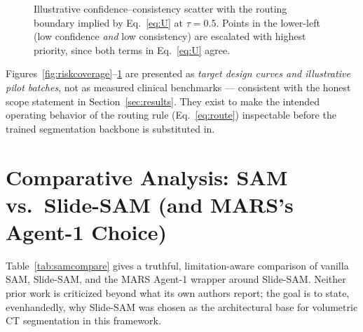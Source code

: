 \documentclass[11pt,a4paper]{article}
\begin{document}
\begin{figure}[htbp]
\centering
{}
\caption{Illustrative confidence--consistency scatter with the routing boundary implied by Eq.~\ref{eq:U} at $\tau=0.5$. Points in the lower-left (low confidence \emph{and} low consistency) are escalated with highest priority, since both terms in Eq.~\ref{eq:U} agree.}
\label{fig:scatter}
\end{figure}

\begin{keytakeaway}
Figures~\ref{fig:riskcoverage}--\ref{fig:scatter} are presented as \emph{target design curves and illustrative pilot batches}, not as measured clinical benchmarks — consistent with the honest scope statement in Section~\ref{sec:results}. They exist to make the intended operating behavior of the routing rule (Eq.~\ref{eq:route}) inspectable before the trained segmentation backbone is substituted in.
\end{keytakeaway}

\section{Comparative Analysis: SAM vs.\ Slide-SAM (and MARS's Agent-1 Choice)}
\label{sec:comparison}

Table~\ref{tab:samcompare} gives a truthful, limitation-aware comparison of vanilla SAM, Slide-SAM, and the MARS Agent-1 wrapper around Slide-SAM. Neither prior work is criticized beyond what its own authors report; the goal is to state, evenhandedly, why Slide-SAM was chosen as the architectural base for volumetric CT segmentation in this framework.
\end{document}
